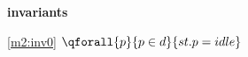 \textbf{invariants}
\begin{block}
\item[ \eqref{m2:inv0} ]{$\qforall{p}{p \in d}{st.p = idle} $} %
\end{block}
